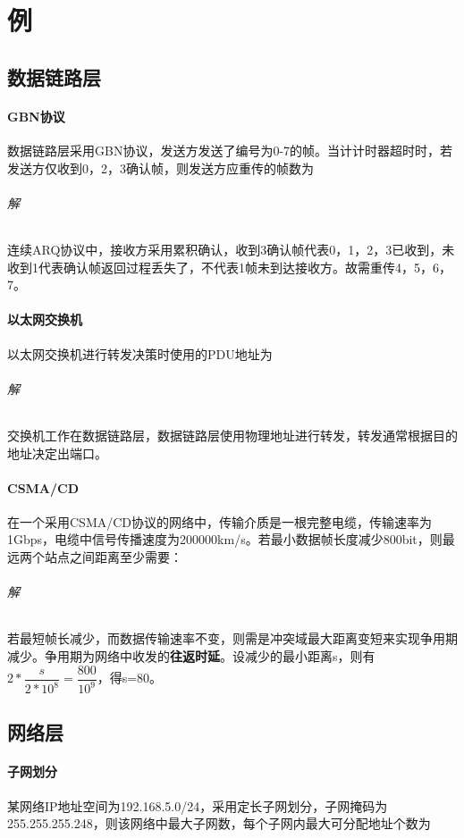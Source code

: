 
\chapter{例}

\section{数据链路层}

\subsubsection{GBN协议}
数据链路层采用GBN协议，发送方发送了编号为0-7的帧。当计计时器超时时，若发送方仅收到0，2，3确认帧，则发送方应重传的帧数为

\subparagraph{解}
连续ARQ协议中，接收方采用累积确认，收到3确认帧代表0，1，2，3已收到，未收到1代表确认帧返回过程丢失了，不代表1帧未到达接收方。故需重传4，5，6，7。


\subsubsection{以太网交换机}
以太网交换机进行转发决策时使用的PDU地址为

\subparagraph{解}
交换机工作在数据链路层，数据链路层使用物理地址进行转发，转发通常根据目的地址决定出端口。



\subsubsection{CSMA/CD}
在一个采用CSMA/CD协议的网络中，传输介质是一根完整电缆，传输速率为1Gbps，电缆中信号传播速度为200000km/s。若最小数据帧长度减少800bit，则最远两个站点之间距离至少需要：

\subparagraph{解}
若最短帧长减少，而数据传输速率不变，则需是冲突域最大距离变短来实现争用期减少。争用期为网络中收发的\textbf{往返时延}。设减少的最小距离s，则有\(2 * \dfrac{s}{2 * 10^8} = \dfrac{800}{10^9}\)，得s=80。


\section{网络层}

\subsubsection{子网划分}
某网络IP地址空间为192.168.5.0/24，采用定长子网划分，子网掩码为255.255.255.248，则该网络中最大子网数，每个子网内最大可分配地址个数为

